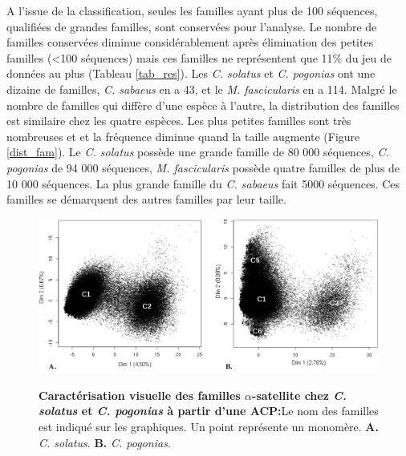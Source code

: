 \documentclass[12pt,a4paper]{article}
\begin{document}
	A l'issue de la classification, seules les familles ayant plus de 100 séquences, qualifiées de grandes familles, sont conservées pour l'analyse. Le nombre de familles conservées diminue considérablement après élimination des petites familles (<100 séquences) mais ces familles ne représentent que 11\% du jeu de données au plus (Tableau \ref{tab_res}). Les \textit{C. solatus} et \textit{C. pogonias} ont une dizaine de familles, \textit{C. sabaeus} en a 43, et le \textit{M. fascicularis} en a 114. Malgré le nombre de familles qui diffère d'une espèce à l'autre, la distribution des familles est similaire chez les quatre espèces. Les plus petites familles sont très nombreuses et et la fréquence diminue quand la taille augmente (Figure \ref{dist_fam}). Le \textit{C. solatus} possède une grande famille de 80 000 séquences, \textit{C. pogonias} de 94 000 séquences, \textit{M. fascicularis} possède quatre familles de plus de 10 000 séquences. La plus grande famille du \textit{C. sabaeus} fait 5000 séquences. Ces familles se démarquent des autres familles par leur taille.

		\begin{figure}	
			\includegraphics[scale=0.4]{img/ACP_experimental.png}  \\
			\caption{\textbf{Caractérisation visuelle des familles $\alpha$-satellite chez \textit{C. solatus} et \textit{C. pogonias} à partir d'une ACP:}Le nom des familles est indiqué sur les graphiques. Un point représente un monomère. \textbf{A.} \textit{C. solatus}. \textbf{B.} \textit{C. pogonias}.}
			\label{fig:ACP_exp} 
	\end{figure}	
	
\end{document}
